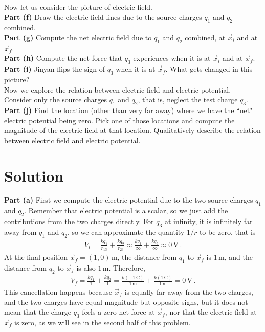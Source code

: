 \documentclass[11pt]{article}
\begin{document}
\noindent Now let us consider the picture of electric field.\\
\noindent\textbf{Part (f)} Draw the electric field lines due to the source charges $q_1$ and $q_2$ combined.\\
\noindent\textbf{Part (g)} Compute the net electric field due to $q_1$ and $q_2$ combined, at $\vec{x}_i$ and at $\vec{x}_f$.\\
\noindent\textbf{Part (h)} Compute the net force that $q_3$ experiences when it is at $\vec{x}_i$ and at $\vec{x}_f$. \\
\noindent\textbf{Part (i)} Jinyan flips the sign of $q_3$ when it is at $\vec{x}_f$. What gets changed in this picture?\\

\noindent Now we explore the relation between electric field and electric potential. \\
Consider only the source charges $q_1$ and $q_2$, that is, neglect the test charge $q_3$.\\
\noindent\textbf{Part (j)} Find the location (other than very far away) where we have the ``net" electric potential being zero. Pick one of those locations and compute the magnitude of the electric field at that location. Qualitatively describe the relation between electric field and electric potential. 

\newpage
\section*{Solution}
\noindent\textbf{Part (a)} First we compute the electric potential due to the two source charges $q_1$ and $q_2$. Remember that electric potential is a scalar, so we just add the contributions from the two charges directly. For $q_3$ at infinity, it is infinitely far away from $q_1$ and $q_2$, so we can approximate the quantity $1/r$ to be zero, that is 
\begin{align*}
V_i = \frac{kq_1}{r_{13}} + \frac{kq_2}{r_{23}} \approx \frac{kq_1}{\infty} + \frac{kq_2}{\infty} \approx 0\,\text{V}\,.
\end{align*}
At the final position $\vec{x}_f=(1,0)$\,m, the distance from $q_1$ to $\vec{x}_f$ is $1$\,m, and the distance from $q_2$ to $\vec{x}_f$ is also $1$\,m. Therefore,
\begin{align*}
V_f = \frac{kq_1}{1}+\frac{kq_2}{1}
= \frac{k(-1\,\text{C})}{1\,\text{m}}+\frac{k(1\,\text{C})}{1\,\text{m}}=0\,\text{V}\,.
\end{align*}
This cancellation happens because $\vec{x}_f$ is equally far away from the two charges, and the two charges have equal magnitude but opposite signs, but it does not mean that the charge $q_3$ feels a zero net force at $\vec{x}_f$, nor that the electric field at $\vec{x}_f$ is zero, as we will see in the second half of this problem. \\
\end{document}
